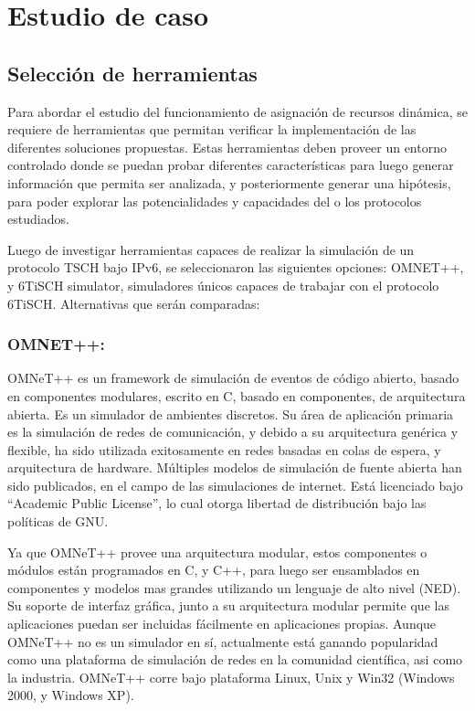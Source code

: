 \chapter[Tema]{Estudio de caso}
\label{ch:tema}




\section{Selección de herramientas}
Para abordar el estudio del funcionamiento de asignación de recursos dinámica, se requiere de herramientas que permitan verificar la implementación de las diferentes soluciones propuestas. Estas herramientas deben proveer un entorno controlado donde se puedan probar diferentes características para luego generar información que permita ser analizada, y posteriormente generar una hipótesis, para poder explorar las potencialidades y capacidades del o los protocolos estudiados.

Luego de investigar herramientas capaces de realizar la simulación de un protocolo TSCH bajo IPv6, se seleccionaron las siguientes opciones: OMNET++, y 6TiSCH simulator, simuladores únicos capaces de trabajar con el protocolo 6TiSCH. Alternativas que serán comparadas:


\subsection{OMNET++:}

OMNeT++ es un framework de simulación de eventos de código abierto, basado en componentes modulares, escrito en C, basado en componentes, de arquitectura abierta. Es un simulador de ambientes discretos. Su área de aplicación primaria es la simulación de redes de comunicación, y debido a su arquitectura genérica y flexible, ha sido utilizada exitosamente en redes basadas en colas de espera, y arquitectura de hardware. Múltiples modelos de simulación de fuente abierta han sido publicados, en el campo de las simulaciones de internet. Está licenciado bajo ``Academic Public License'', lo cual otorga libertad de distribución bajo las políticas de GNU.

Ya que OMNeT++ provee una arquitectura modular, estos componentes o módulos están programados en C, y C++, para luego ser ensamblados en componentes y modelos mas grandes utilizando un lenguaje de alto nivel (NED). Su soporte de interfaz gráfica, junto a su arquitectura modular permite que las aplicaciones puedan ser incluidas fácilmente en aplicaciones propias. Aunque OMNeT++ no es un simulador en sí, actualmente está ganando popularidad como una plataforma de simulación de redes en la comunidad científica, asi como la industria. OMNeT++ corre bajo plataforma Linux, Unix y Win32 (Windows 2000, y Windows XP).

